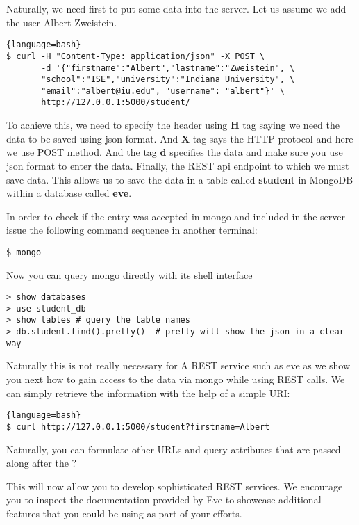 Naturally, we need first to put some data into the server. Let us assume
we add the user Albert Zweistein.

\begin{lstlisting}{language=bash}
$ curl -H "Content-Type: application/json" -X POST \
       -d '{"firstname":"Albert","lastname":"Zweistein", \
       "school":"ISE","university":"Indiana University", \
       "email":"albert@iu.edu", "username": "albert"}' \
       http://127.0.0.1:5000/student/
\end{lstlisting}

To achieve this, we need to specify the header using \textbf{H} tag
saying we need the data to be saved using json format. And \textbf{X}
tag says the HTTP protocol and here we use POST method. And the tag
\textbf{d} specifies the data and make sure you use json format to
enter the data. Finally, the REST api endpoint to which we must save
data. This allows us to save the data in a table called
\textbf{student} in MongoDB within a database called \textbf{eve}.

In order to check if the entry was accepted in mongo and included in the
server issue the following command sequence in another terminal:

\begin{lstlisting}
$ mongo
\end{lstlisting}

Now you can query mongo directly with its shell interface

\begin{lstlisting}
> show databases
> use student_db  
> show tables # query the table names
> db.student.find().pretty()  # pretty will show the json in a clear way
\end{lstlisting}

Naturally this is not really necessary for A REST service such as eve
as we show you next how to gain access to the data via mongo while
using REST calls. We can simply retrieve
the information with the help of a simple URI:


\begin{lstlisting}{language=bash}
$ curl http://127.0.0.1:5000/student?firstname=Albert
\end{lstlisting}

Naturally, you can formulate other URLs and query attributes that are
passed along after the ? 

This will now allow you to develop sophisticated REST services. We
encourage you to inspect the documentation provided by Eve to showcase
additional features that you could be using as part of your efforts.

